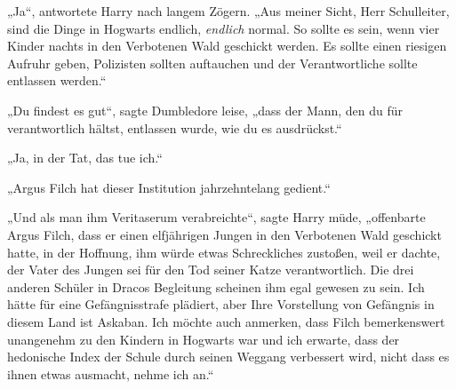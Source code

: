 „Ja“, antwortete Harry nach langem Zögern.
„Aus meiner Sicht, Herr Schulleiter, sind die Dinge in Hogwarts endlich, \emph{endlich} normal. So sollte es sein, wenn vier Kinder nachts in den Verbotenen Wald geschickt werden. Es sollte einen riesigen Aufruhr geben, Polizisten sollten auftauchen und der Verantwortliche sollte entlassen werden.“

„Du findest es gut“, sagte Dumbledore leise, „dass der Mann, den du für verantwortlich hältst, entlassen wurde, wie du es ausdrückst.“

„Ja, in der Tat, das tue ich.“

„Argus Filch hat dieser Institution jahrzehntelang gedient.“

„Und als man ihm Veritaserum verabreichte“, sagte Harry müde, „offenbarte Argus Filch, dass er einen elfjährigen Jungen in den Verbotenen Wald geschickt hatte, in der Hoffnung, ihm würde etwas Schreckliches zustoßen, weil er dachte, der Vater des Jungen sei für den Tod seiner Katze verantwortlich. Die drei anderen Schüler in Dracos Begleitung scheinen ihm egal gewesen zu sein. Ich hätte für eine Gefängnisstrafe plädiert, aber Ihre Vorstellung von Gefängnis in diesem Land ist Askaban. Ich möchte auch anmerken, dass Filch bemerkenswert unangenehm zu den Kindern in Hogwarts war und ich erwarte, dass der hedonische Index der Schule durch seinen Weggang verbessert wird, nicht dass es ihnen etwas ausmacht, nehme ich an.“

